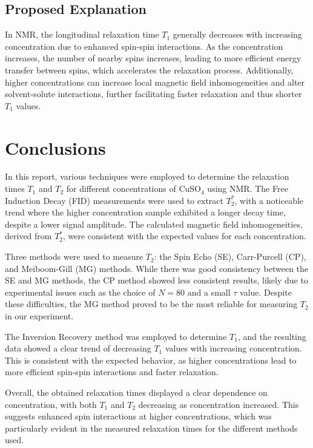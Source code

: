 \documentclass[12pt]{article}
\begin{document}
\subsection{Proposed Explanation}

In NMR, the longitudinal relaxation time \( T_1 \) generally decreases with increasing concentration due to enhanced spin-spin interactions. As the concentration increases, the number of nearby spins increases, leading to more efficient energy transfer between spins, which accelerates the relaxation process. Additionally, higher concentrations can increase local magnetic field inhomogeneities and alter solvent-solute interactions, further facilitating faster relaxation and thus shorter \( T_1 \) values.


\section{Conclusions}

In this report, various techniques were employed to determine the relaxation times $T_1$ and $T_2$ for different concentrations of $\text{CuSO}_4$ using NMR. The Free Induction Decay (FID) measurements were used to extract $T_2^*$, with a noticeable trend where the higher concentration sample exhibited a longer decay time, despite a lower signal amplitude. The calculated magnetic field inhomogeneities, derived from $T_2^*$, were consistent with the expected values for each concentration.

Three methods were used to measure $T_2$: the Spin Echo (SE), Carr-Purcell (CP), and Meiboom-Gill (MG) methods. While there was good consistency between the SE and MG methods, the CP method showed less consistent results, likely due to experimental issues such as the choice of $N = 80$ and a small $\tau$ value. Despite these difficulties, the MG method proved to be the most reliable for measuring $T_2$ in our experiment.

The Inversion Recovery method was employed to determine $T_1$, and the resulting data showed a clear trend of decreasing $T_1$ values with increasing concentration. This is consistent with the expected behavior, as higher concentrations lead to more efficient spin-spin interactions and faster relaxation.

Overall, the obtained relaxation times displayed a clear dependence on concentration, with both $T_1$ and $T_2$ decreasing as concentration increased. This suggests enhanced spin interactions at higher concentrations, which was particularly evident in the measured relaxation times for the different methods used.

\printbibliography[heading=bibintoc]{}
\end{document}
